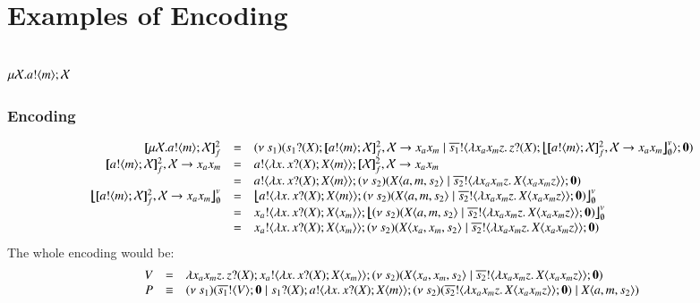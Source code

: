 \section{Examples of Encoding}


\subsection{$\mu \mathcal{X}. a ! \langle m \rangle ; \mathcal{X}$}

\subsubsection{Encoding}

\[
	\begin{array}{rcl}
		\pmapp{\recp{X}{\bout{a}{m} \rvar{X}}}{2}{f} & = &
		\newsp{s_1}{ \binp{s_1}{X} \pmapp{\bout{a}{m} \rvar{X}}{2}{f, \rvar{X} \rightarrow x_ax_m} \Par \bout{\dual{s_1}}{ \abs{x_a x_m z} \binp{z}{X} \auxmapp{\pmapp{\bout{a}{m} \rvar{X}}{2}{f, \rvar{X} \rightarrow x_ax_m}}{v}{\es} } \inact}
		\\

		\pmapp{\bout{a}{m} \rvar{X}}{2}{f, \rvar{X} \rightarrow x_ax_m} &=&
		\bout{a}{\abs{x}{\binp{x}{X} \appl{X}{m}}} \pmapp{\rvar{X}}{2}{f, \rvar{X} \rightarrow x_ax_m}
		\\
		&=& \bout{a}{\abs{x}{\binp{x}{X} \appl{X}{m}}} \newsp{s_2}{\appl{X}{a,m, s_2}  \Par \bout{\dual{s_2}}{\abs{x_a x_m z}{\appl{X}{x_a x_m z}}} \inact}
		\\

		\auxmapp{\pmapp{\bout{a}{m} \rvar{X}}{2}{f, \rvar{X} \rightarrow x_ax_m}}{v}{\es} &=&
		\auxmapp{\bout{a}{\abs{x}{\binp{x}{X} \appl{X}{m}}} \newsp{s_2}{\appl{X}{a,m, s_2}  \Par \bout{\dual{s_2}}{\abs{x_a x_m z}{\appl{X}{x_a x_m z}}} \inact}}{v}{\es}
		\\

		& = & \bout{x_a}{\abs{x}{\binp{x}{X} \appl{X}{x_m}}} \auxmapp{\newsp{s_2}{\appl{X}{a,m, s_2}  \Par \bout{\dual{s_2}}{\abs{x_a x_m z}{\appl{X}{x_a x_m z}}} \inact}}{v}{\es}
		\\
		& = & \bout{x_a}{\abs{x}{\binp{x}{X} \appl{X}{x_m}}} \newsp{s_2}{\appl{X}{x_a,x_m, s_2}  \Par \bout{\dual{s_2}}{\abs{x_a x_m z}{\appl{X}{x_a x_m z}}} \inact}
	\end{array}
\]
\noi The whole encoding would be:
\[
	\begin{array}{rcl}
		V & = & \lambda x_a x_m z.\,z ? (X) ; x_a ! \langle \lambda x.\,x ? (X) ; X\langle x_m \rangle \rangle ; (\nu\ s_2)(X\langle x_a,x_m, s_2 \rangle  \;|\; \overline{s_2} ! \langle \lambda x_a x_m z.\,X\langle x_a x_m z \rangle \rangle ; \mathbf{0})\\
		P & \equiv &
		(\nu\ s_1)(\overline{s_1} ! \langle V \rangle ; \mathbf{0} \;|\; s_1 ? (X) ; a ! \langle \lambda x.\,x ? (X) ; X\langle m \rangle \rangle ; (\nu\ s_2)(\overline{s_2} ! \langle \lambda x_a x_m z.\,X\langle x_a x_m z \rangle \rangle ; \mathbf{0}) \;|\; X\langle a,m, s_2 \rangle)
	\end{array}
\]

